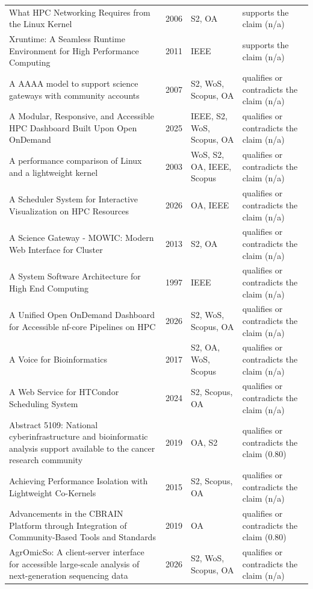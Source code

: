 \begin{longtable}{@{}%
  >{\raggedright\arraybackslash}p{}c%
  >{\raggedright\arraybackslash}p{}%
  >{\raggedright\arraybackslash}p{}@{}}
What HPC Networking Requires from the Linux Kernel & 2006 & S2, OA & supports the claim (n/a) \\
Xruntime: A Seamless Runtime Environment for High Performance Computing & 2011 & IEEE & supports the claim (n/a) \\
A AAAA model to support science gateways with community accounts & 2007 & S2, WoS, Scopus, OA & qualifies or contradicts the claim (n/a) \\
A Modular, Responsive, and Accessible HPC Dashboard Built Upon Open OnDemand & 2025 & IEEE, S2, WoS, Scopus, OA & qualifies or contradicts the claim (n/a) \\
A performance comparison of Linux and a lightweight kernel & 2003 & WoS, S2, OA, IEEE, Scopus & qualifies or contradicts the claim (n/a) \\
A Scheduler System for Interactive Visualization on HPC Resources & 2026 & OA, IEEE & qualifies or contradicts the claim (n/a) \\
A Science Gateway - MOWIC: Modern Web Interface for Cluster & 2013 & S2, OA & qualifies or contradicts the claim (n/a) \\
A System Software Architecture for High End Computing & 1997 & IEEE & qualifies or contradicts the claim (n/a) \\
A Unified Open OnDemand Dashboard for Accessible nf-core Pipelines on HPC & 2026 & S2, WoS, Scopus, OA & qualifies or contradicts the claim (n/a) \\
A Voice for Bioinformatics & 2017 & S2, OA, WoS, Scopus & qualifies or contradicts the claim (n/a) \\
A Web Service for HTCondor Scheduling System & 2024 & S2, Scopus, OA & qualifies or contradicts the claim (n/a) \\
Abstract 5109: National cyberinfrastructure and bioinformatic analysis support available to the cancer research community & 2019 & OA, S2 & qualifies or contradicts the claim (0.80) \\
Achieving Performance Isolation with Lightweight Co-Kernels & 2015 & S2, Scopus, OA & qualifies or contradicts the claim (n/a) \\
Advancements in the CBRAIN Platform through Integration of Community-Based Tools and Standards & 2019 & OA & qualifies or contradicts the claim (0.80) \\
AgrOmicSo: A client-server interface for accessible large-scale analysis of next-generation sequencing data & 2026 & S2, WoS, Scopus, OA & qualifies or contradicts the claim (n/a) \\

\end{longtable}
